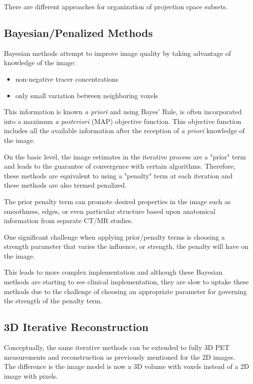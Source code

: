 \documentclass{article}
\begin{document}
There are different approaches for organization of projection space subsets.


\subsection{Bayesian/Penalized Methods}
Bayesian methods attempt to improve image quality by taking advantage of knowledge of the image:
\begin{itemize}
\item non-negative tracer concentrations
\item only small variation between neighboring voxels
\end{itemize}
This information is known \textit{a priori} and using Bayes' Rule, is often incorporated into a maximum \textit{a posteriori} (MAP) objective function. This objective function includes all the available information after the reception of \textit{a priori} knowledge of the image.

On the basic level, the image estimates in the iterative process are a "prior" term and leads to the guarantee of convergence with certain algorithms. Therefore, these methods are equivalent to using a "penalty" term at each iteration and these methods are also termed penalized.

The prior penalty term can promote desired properties in the image such as smoothness, edges, or even particular structure based upon anatomical information from separate CT/MR studies.

One significant challenge when applying prior/penalty terms is choosing a strength parameter that varies the influence, or strength, the penalty will have on the image. 

This leads to more complex implementation and although these Bayesian methods are starting to see clinical implementation, they are slow to uptake these methods due to the challenge of choosing an appropriate parameter for governing the strength of the penalty term.


\subsection{3D Iterative Reconstruction}

Conceptually, the same iterative methods can be extended to fully 3D PET measurements and reconstruction as previously mentioned for the 2D images. The difference is the image model is now a 3D volume with voxels instead of a 2D image with pixels.
\end{document}
